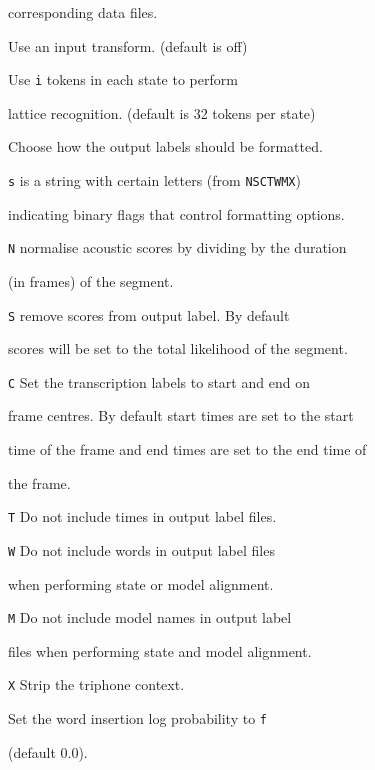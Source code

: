 \begin{optlist}
      corresponding data files.





   Use an input transform. (default is off)





   Use \texttt{i} tokens in each state to perform


        lattice recognition. (default is 32 tokens per state)





   Choose how the output labels should be formatted.


        \texttt{s} is a string with certain letters (from \texttt{NSCTWMX}) 


        indicating binary flags that control formatting options. 


        \texttt{N} normalise acoustic scores by dividing by the duration


        (in frames) of the segment.


        \texttt{S} remove scores from output label.  By default 


        scores will be set to the total likelihood of the segment.


        \texttt{C} Set the transcription labels to start and end on


        frame centres. By default start times are set to the start


        time of the frame and end times are set to the end time of 


        the frame.


        \texttt{T} Do not include times in output label files.


        \texttt{W} Do not include words in output label files


        when performing state or model alignment.


        \texttt{M} Do not include model names in output label


        files when performing state and model alignment.


        \texttt{X} Strip the triphone context.





    Set the word insertion log probability to \texttt{f} 


        (default 0.0).






\end{optlist}
